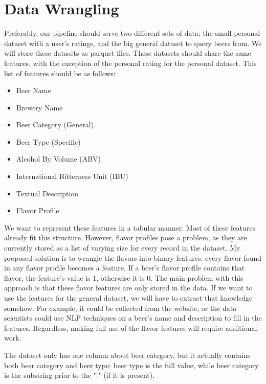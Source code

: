 \documentclass[sigconf, natbib=true]{acmart}
\begin{document}
\section{Data Wrangling}
Preferably, our pipeline should serve two different sets of data: the small personal dataset with a user's ratings, and the big general dataset to query beers from.
We will store these datasets as parquet files.
These datasets should share the same features, with the exception of the personal rating for the personal dataset.
This list of features should be as follows:
\begin{itemize}
    \item Beer Name
    \item Brewery Name
    \item Beer Category (General)
    \item Beer Type (Specific)
    \item Alcohol By Volume (ABV)
    \item International Bitterness Unit (IBU)
    \item Textual Description
    \item Flavor Profile
\end{itemize}
We want to represent these features in a tabular manner.
Most of these features already fit this structure.
However, flavor profiles pose a problem, as they are currently stored as a list of varying size for every record in the \citeauthor{untappd} dataset.
My proposed solution is to wrangle the flavors into binary features: every flavor found in any flavor profile becomes a feature.
If a beer's flavor profile contains that flavor, the feature's value is 1, otherwise it is 0.
The main problem with this approach is that these flavor features are only stored in the \citeauthor{untappd} data.
If we want to use the features for the general dataset, we will have to extract that knowledge somehow.
For example, it could be collected from the \citeauthor{untappd} website, or the data scientists could use NLP techniques on a beer's name and description to fill in the features.
Regardless, making full use of the flavor features will require additional work.

The \citeauthor{untappd} dataset only has one column about beer category, but it actually contains both beer category and beer type: beer type is the full value, while beer category is the substring prior to the "-" (if it is present).
\end{document}
